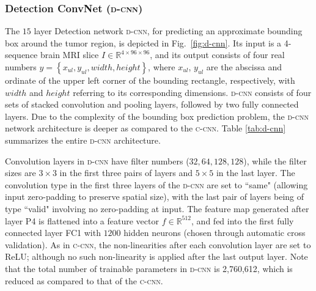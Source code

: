 \documentclass[journal,twocolumn]{IEEEtran}
\begin{document}
\subsubsection{Detection ConvNet ({\scshape{d-cnn}})} The $15$ layer Detection network {\scshape{d-cnn}},  for predicting an approximate bounding box around the tumor region, is depicted in Fig.~\ref{fig:d-cnn}.   Its  input is a 4-sequence brain MRI slice $I \in \mathbb{R}^{4 \times 96 \times 96}$,  and its  output consists of  four real numbers $y = \left\lbrace x_{ul}, y_{ul}, width, height\right\rbrace $,  where $x_{ul}$, $y_{ul}$ are the abscissa and ordinate of the  upper left corner of the bounding rectangle, respectively,  with  $width$  and $height$  referring  to its  corresponding dimensions. {\scshape{d-cnn}} consists of four  sets of stacked convolution and pooling layers, followed by two fully connected layers. Due to the complexity of the  bounding box prediction problem, the {\scshape{d-cnn}} network architecture is deeper as compared to the  {\scshape{c-cnn}}. Table \ref{tab:d-cnn}  summarizes the entire {\scshape{d-cnn}} architecture.

Convolution layers in {\scshape{d-cnn}} have  filter numbers ($32, 64, 128, 128$), while the filter sizes are $3 \times 3$  in the first three pairs of layers and  $5 \times 5$ in the last layer. The convolution type in  the first three layers of the {\scshape{d-cnn}} are set to ``same"  (allowing input zero-padding to preserve spatial size),  with  the last pair of  layers  being of type ``valid"  involving no  zero-padding at input. The feature map generated after  layer P4 is  flattened into a feature vector  $f \in \mathbb{R}^{512}$, and  fed into the first fully connected layer FC1 with $1200$ hidden neurons (chosen through automatic cross validation).  As in  {\scshape{c-cnn}}, the non-linearities after each convolution layer are set to ReLU; although  no such non-linearity is applied after the last output layer. Note that the total number of trainable parameters in {\scshape{d-cnn}} is  2,760,612, which is  reduced as compared to that of the {\scshape{c-cnn}}.
\end{document}
